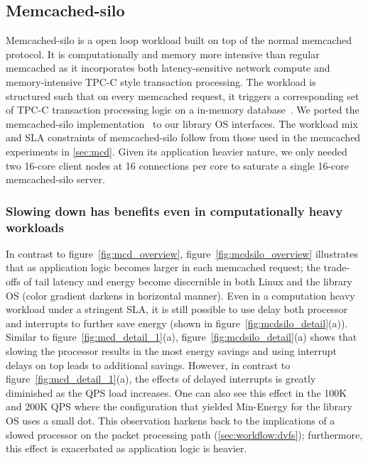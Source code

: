 \subsection{Memcached-silo}
\label{sec:mcdsilo}
Memcached-silo is a open loop workload built on top of the normal memcached protocol. It is computationally and memory more intensive than regular memcached as it incorporates both latency-sensitive network compute and memory-intensive TPC-C style transaction processing. The workload is structured such that on every memcached request, it triggers a corresponding set of TPC-C transaction processing logic on a in-memory database~\cite{silo}. We ported the memcached-silo implementation~\cite{mcdsilo, zygos} to our library OS interfaces. The workload mix and SLA constraints of memcached-silo follow from those used in the memcached experiments in \cref{sec:mcd}. Given its application heavier nature, we only needed two 16-core client nodes at 16 connections per core to saturate a single 16-core memcached-silo server. 

\subsubsection{Slowing down has benefits even in computationally heavy workloads}
\label{sec:mcdsilo:dvfstradeoff}
In contrast to figure~\ref{fig:mcd_overview}, figure~\ref{fig:mcdsilo_overview} illustrates that as application logic becomes larger in each memcached request; the trade-offs of tail latency and energy become discernible in both Linux and the library OS (color gradient darkens in horizontal manner). Even in a computation heavy workload under a stringent SLA, it is still possible to use delay both processor and interrupts to further save energy (shown in figure~\ref{fig:mcdsilo_detail}(a)). Similar to figure~\ref{fig:mcd_detail_1}(a), figure~\ref{fig:mcdsilo_detail}(a) shows that slowing the processor results in the most energy savings and using interrupt delays on top leads to additional savings. However, in contrast to figure~\ref{fig:mcd_detail_1}(a), the effects of delayed interrupts is greatly diminished as the QPS load increases. One can also see this effect in the 100K and 200K QPS where the configuration that yielded Min-Energy for the library OS uses a small dot. This observation harkens back to the implications of a slowed processor on the packet processing path (\cref{sec:workflow:dvfs}); furthermore, this effect is exacerbated as application logic is heavier.

